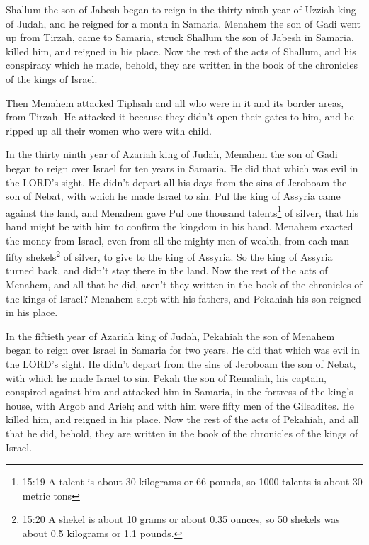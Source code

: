 \myverse{}Shallum the son of Jabesh began to reign in the thirty-ninth
year of Uzziah king of Judah, and he reigned for a month in Samaria.
\myverse{}Menahem the son of Gadi went up from Tirzah, came to Samaria, struck Shallum
the son of Jabesh in Samaria, killed him, and reigned in his place.
\myverse{}Now the rest of the acts of Shallum, and his conspiracy which he made, behold,
they are written in the book of the chronicles of the kings of Israel.

\myverse{}Then Menahem attacked Tiphsah and all who were in it and its
border areas, from Tirzah. He attacked it because they didn’t open their gates to him, and he ripped up
all their women who were with child.

\myverse{}In the thirty ninth year of Azariah king of Judah, Menahem the
son of Gadi began to reign over Israel for ten years in Samaria.
\myverse{}He did that which was evil in the LORD’s sight. He didn’t depart all his
days from the sins of Jeroboam the son of Nebat, with which he made Israel to sin.
\myverse{}Pul the king of Assyria came against the land, and Menahem gave Pul one thousand
talents\footnote{15:19 A talent is about 30 kilograms or 66 pounds, so 1000 talents is about 30 metric tons}
of silver, that his hand might be with him to confirm the kingdom in his hand.
\myverse{}Menahem exacted the money from Israel, even from all the mighty men of wealth,
from each man fifty shekels\footnote{15:20 A shekel is about 10 grams or about 0.35 ounces, so 50 shekels was about 0.5 kilograms or 1.1
	pounds.} of silver, to give to the king of Assyria. So the king of Assyria turned back, and didn’t
stay there in the land.
\myverse{}Now the rest of the acts of Menahem, and all that he did, aren’t they written
in the book of the chronicles of the kings of Israel?
\myverse{}Menahem slept with his fathers, and Pekahiah his son reigned in his place.

\myverse{}In the fiftieth year of Azariah king of Judah, Pekahiah the
son of Menahem began to reign over Israel in Samaria for two years.
\myverse{}He did that which was evil in the LORD’s sight. He didn’t depart from the
sins of Jeroboam the son of Nebat, with which he made Israel to sin.
\myverse{}Pekah the son of Remaliah, his captain, conspired against him and attacked
him in Samaria, in the fortress of the king’s house, with Argob and Arieh; and with him were fifty men
of the Gileadites. He killed him, and reigned in his place.
\myverse{}Now the rest of the acts of Pekahiah, and all that he did, behold, they are
written in the book of the chronicles of the kings of Israel.

